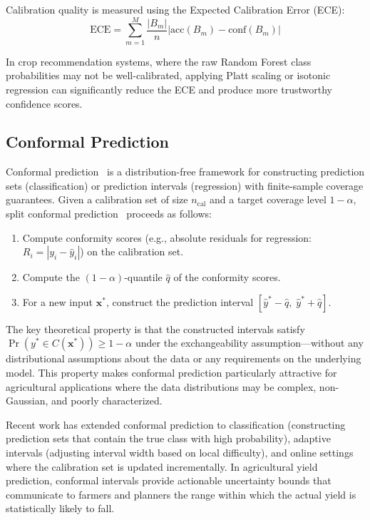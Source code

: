 \documentclass[journal]{IEEEtran}
\begin{document}
Calibration quality is measured using the Expected Calibration Error (ECE):
\begin{equation}
  \text{ECE} = \sum_{m=1}^{M} \frac{|B_m|}{n} \left| \text{acc}(B_m) - \text{conf}(B_m) \right|
\end{equation}

In crop recommendation systems, where the raw Random Forest class probabilities may not be well-calibrated, applying Platt scaling or isotonic regression can significantly reduce the ECE and produce more trustworthy confidence scores.

\subsection{Conformal Prediction}

Conformal prediction~\cite{vovk2005algorithmic,shafer2008tutorial,angelopoulos2023conformal} is a distribution-free framework for constructing prediction sets (classification) or prediction intervals (regression) with finite-sample coverage guarantees. Given a calibration set of size $n_{\text{cal}}$ and a target coverage level $1-\alpha$, split conformal prediction~\cite{papadopoulos2002inductive} proceeds as follows:

\begin{enumerate}[leftmargin=*]
  \item Compute conformity scores (e.g., absolute residuals for regression: $R_i = |y_i - \hat{y}_i|$) on the calibration set.
  \item Compute the $(1-\alpha)$-quantile $\hat{q}$ of the conformity scores.
  \item For a new input $\mathbf{x}^*$, construct the prediction interval $[\hat{y}^* - \hat{q}, \; \hat{y}^* + \hat{q}]$.
\end{enumerate}

The key theoretical property is that the constructed intervals satisfy $\Pr(y^* \in C(\mathbf{x}^*)) \geq 1 - \alpha$ under the exchangeability assumption---without any distributional assumptions about the data or any requirements on the underlying model. This property makes conformal prediction particularly attractive for agricultural applications where the data distributions may be complex, non-Gaussian, and poorly characterized.

Recent work has extended conformal prediction to classification (constructing prediction sets that contain the true class with high probability), adaptive intervals (adjusting interval width based on local difficulty), and online settings where the calibration set is updated incrementally. In agricultural yield prediction, conformal intervals provide actionable uncertainty bounds that communicate to farmers and planners the range within which the actual yield is statistically likely to fall.
\end{document}
